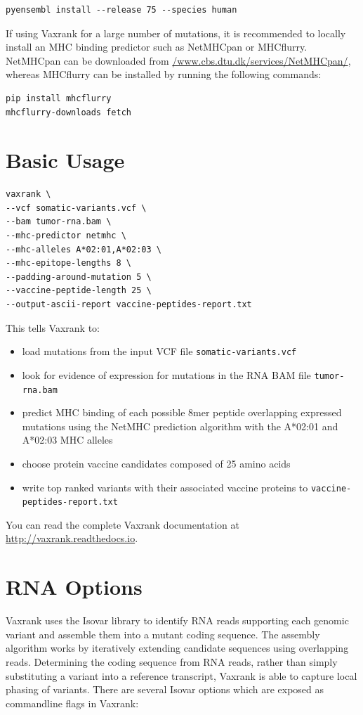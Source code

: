 \documentclass[10pt,letterpaper]{article}
\begin{document}
\begin{verbatim}
pyensembl install --release 75 --species human
\end{verbatim}

If using Vaxrank for a large number of mutations, it is recommended to locally install an MHC binding predictor such as NetMHCpan or MHCflurry. NetMHCpan can be downloaded from \href{http://www.cbs.dtu.dk/services/NetMHCpan/}{/www.cbs.dtu.dk/services/NetMHCpan/}, whereas MHCflurry can be installed by running the following commands:

\begin{verbatim}
pip install mhcflurry
mhcflurry-downloads fetch
\end{verbatim}

\section*{Basic Usage}

\begin{verbatim}
vaxrank \
--vcf somatic-variants.vcf \
--bam tumor-rna.bam \
--mhc-predictor netmhc \
--mhc-alleles A*02:01,A*02:03 \
--mhc-epitope-lengths 8 \
--padding-around-mutation 5 \
--vaccine-peptide-length 25 \
--output-ascii-report vaccine-peptides-report.txt
\end{verbatim}

This tells Vaxrank to:
\begin{itemize}
	\item load mutations from the input VCF file \verb|somatic-variants.vcf| 
	\item look for evidence of expression for mutations in the RNA BAM file \verb|tumor-rna.bam|
	\item predict MHC binding of each possible 8mer peptide overlapping expressed mutations  using the NetMHC prediction algorithm with the A*02:01 and A*02:03 MHC alleles
	\item choose protein vaccine candidates composed of 25 amino acids
	\item write top ranked variants with their associated vaccine proteins to \verb|vaccine-peptides-report.txt|
\end{itemize}

You can read the complete Vaxrank documentation at \href{http://vaxrank.readthedocs.io}{http://vaxrank.readthedocs.io}.

\section*{RNA Options}
Vaxrank uses the Isovar library to identify RNA reads supporting each genomic variant and assemble them into a mutant coding sequence. The assembly algorithm works by iteratively extending candidate sequences using overlapping reads. Determining the coding sequence from RNA reads, rather than simply substituting a variant into a reference transcript, Vaxrank is able to capture local phasing of variants. There are several Isovar options which are exposed as commandline flags in Vaxrank:
\end{document}
